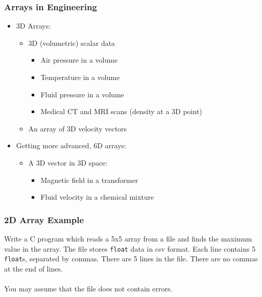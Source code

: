 \documentclass[14pt]{beamer}
\begin{document}
\begin{frame}
\frametitle{Arrays in Engineering}
\begin{itemize}
\item 3D Arrays:
	\begin{itemize}
		\item 3D (volumetric) scalar data
		\pause
		\begin{itemize}
			\item Air pressure in a volume
			\item Temperature in a volume
			\item Fluid pressure in a volume
			\item Medical CT and MRI scans (density at a 3D point)
		\end{itemize}
		\item An array of 3D velocity vectors
	\end{itemize}
\pause
\item Getting more advanced, 6D arrays:
\pause
	\begin{itemize}
		\item A 3D vector in 3D space:
		\pause
		\begin{itemize}
			\item Magnetic field in a transformer
			\item Fluid velocity in a chemical mixture
		\end{itemize}
	\end{itemize}
\end{itemize}
\end{frame}

\begin{frame}
\frametitle{2D Array Example}
Write a C program which reads a 5x5 array from a file and finds the maximum value in the array. The file stores \texttt{float} data in csv format. Each line contains 5 \texttt{float}s, separated by commas. There are 5 lines in the file. There are no commas at the end of lines.
\\~\\
You may assume that the file does not contain errors.
\end{frame}
\end{document}
